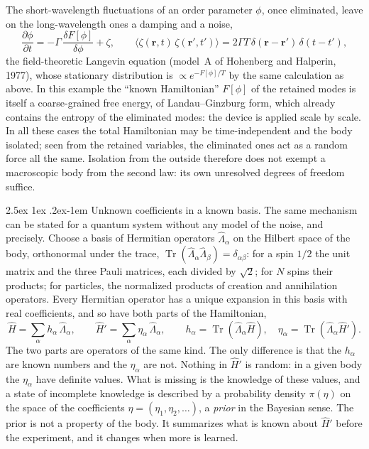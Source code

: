 \documentclass[10pt,a4paper]{article}
\makeatletter
\renewcommand{\paragraph}{\@startsection{paragraph}{4}{\z@}%
  {2.5ex \@plus 1ex \@minus .2ex}{-1em}%
  {\normalfont\fontsize{14pt}{17pt}\selectfont\bfseries}}
\newcommand{\Tr}{\operatorname{Tr}}
\makeatother
\begin{document}
The short-wavelength fluctuations of an order parameter $ \phi $, once eliminated, leave on the long-wavelength ones a damping and a noise,
\[
  \frac{\partial\phi}{\partial t} = -\Gamma\,\frac{\delta F[\phi]}{\delta\phi} + \zeta ,
  \qquad
  \langle\zeta(\mathbf{r}, t)\,\zeta(\mathbf{r}', t')\rangle
  = 2\Gamma T\,\delta(\mathbf{r} - \mathbf{r}')\,\delta(t - t') ,
\]
the field-theoretic Langevin equation (model~A of Hohenberg and Halperin, 1977), whose stationary distribution is $ \propto e^{-F[\phi]/T} $ by the same calculation as above.
In this example the ``known Hamiltonian'' $ F[\phi] $ of the retained modes is itself a coarse-grained free energy, of Landau--Ginzburg form, which already contains the entropy of the eliminated modes: the device is applied scale by scale.
In all these cases the total Hamiltonian may be time-independent and the body isolated; seen from the retained variables, the eliminated ones act as a random force all the same.
Isolation from the outside therefore does not exempt a macroscopic body from the second law: its own unresolved degrees of freedom suffice.

\paragraph{Unknown coefficients in a known basis.}
The same mechanism can be stated for a quantum system without any model of the noise, and precisely.
Choose a basis of Hermitian operators $ \hat\Lambda_\alpha $ on the Hilbert space of the body, orthonormal under the trace, $ \Tr(\hat\Lambda_\alpha\hat\Lambda_\beta) = \delta_{\alpha\beta} $: for a spin $ 1/2 $ the unit matrix and the three Pauli matrices, each divided by $ \sqrt2 $; for $ N $ spins their products; for particles, the normalized products of creation and annihilation operators.
Every Hermitian operator has a unique expansion in this basis with real coefficients, and so have both parts of the Hamiltonian,
\begin{equation}\label{eq:Hprime_expansion}
  \hat H = \sum_\alpha h_\alpha\,\hat\Lambda_\alpha , \qquad
  \hat H' = \sum_\alpha\eta_\alpha\,\hat\Lambda_\alpha , \qquad
  h_\alpha = \Tr(\hat\Lambda_\alpha\hat H) , \quad \eta_\alpha = \Tr(\hat\Lambda_\alpha\hat H') .
\end{equation}
The two parts are operators of the same kind.
The only difference is that the $ h_\alpha $ are known numbers and the $ \eta_\alpha $ are not.
Nothing in $ \hat H' $ is random: in a given body the $ \eta_\alpha $ have definite values.
What is missing is the knowledge of these values, and a state of incomplete knowledge is described by a probability density $ \pi(\eta) $ on the space of the coefficients $ \eta = (\eta_1, \eta_2, \dots) $, a \emph{prior} in the Bayesian sense.
The prior is not a property of the body.
It summarizes what is known about $ \hat H' $ before the experiment, and it changes when more is learned.
\end{document}
